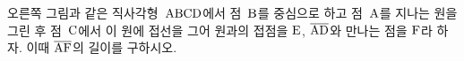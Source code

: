 \noindent\begin{minipage}[t]{0.58\linewidth}\vspace{0pt}\raggedright 오른쪽 그림과 같은 직사각형~$\mathrm{ABCD}$에서 점~$\mathrm{B}$를 중심으로 하고 점~$\mathrm{A}$를 지나는 원을 그린 후 점~$\mathrm{C}$에서 이 원에 접선을 그어 원과의 접점을 $\mathrm{E}$, $\overline{\mathrm{AD}}$와 만나는 점을 $\mathrm{F}$라 하자. 이때 $\overline{\mathrm{AF}}$의 길이를 구하시오.\end{minipage}\hfill\begin{minipage}[t]{0.4\linewidth}\vspace{0pt}\centering \resizebox{\ifdim\width>\linewidth\linewidth\else\width\fi}{!}{}\end{minipage}\par
